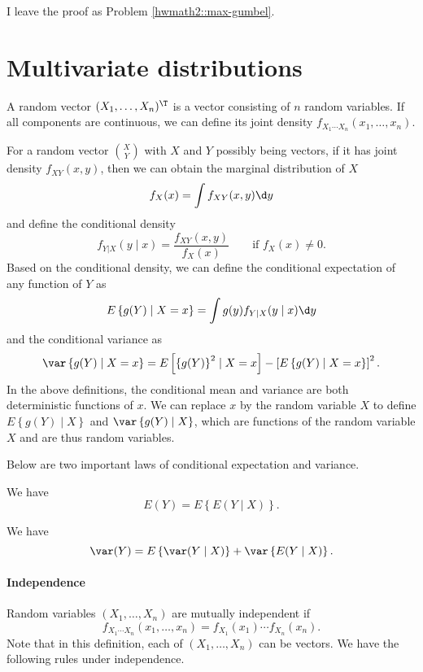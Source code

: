 I leave the proof as Problem \ref{hwmath2::max-gumbel}. 




\section{Multivariate distributions}

A random vector $(X_{1},\ldots,X_{n})^{\T}$ is a vector consisting of $n$ random
variables. If all components are continuous, we can define its joint
density $f_{X_{1}\cdots X_{n}}(x_{1},\ldots,x_{n}).$ 

For a random vector $\binom{X}{Y}$ with $X$ and $Y$ possibly being
vectors, if it has joint density $f_{XY}(x,y)$, then we can obtain
the marginal distribution of $X$   
$$
f_{X}(x)=\int f_{XY}(x,y)\d y
$$
and define the conditional density  
\[
f_{Y|X}(y\mid x)=\frac{f_{XY}(x,y)}{f_{X}(x)}\qquad \text{if }  f_{X}(x)\neq 0. 
\]
Based on the conditional density, we can define the conditional expectation
of any function of $Y$  as 
\[
E\left\{ g(Y)\mid X=x\right\} =\int g(y)f_{Y|X}(y\mid x)\d y
\]
and the conditional variance as 
\[
\var\left\{ g(Y)\mid X=x\right\} =E\left[\left\{ g(Y)\right\} ^{2}\mid X=x\right]-\left[E\left\{ g(Y)\mid X=x\right\} \right]^{2}.
\]
 In the above definitions, the conditional mean and variance are both deterministic
functions of $x$. We can replace $x$ by the random variable $X$ to define 
$E\left\{ g(Y)\mid X\right\} $
and $\var\left\{ g(Y)\mid X\right\} $, which are functions of the
random variable $X$ and are thus random variables. 

Below are two important laws of conditional expectation and variance. 

\begin{theorem}
 We have 
\[
E( Y ) =E\left\{  E ( Y \mid X ) \right\}  . 
\]
\end{theorem}


\begin{theorem}
\label{theorem::law-total-var}
We have 
\[
\var (Y) =E\left\{  \var( Y \mid X) \right\}  +\var\left\{  E(Y \mid X) \right\}  . 
\]
\end{theorem}
 

\paragraph*{Independence}

Random variables $(X_{1},\ldots,X_{n})$ are mutually independent
if 
$$
f_{X_{1}\cdots X_{n}}(x_{1},\ldots,x_{n})=f_{X_{1}}(x_{1})\cdots f_{X_{n}}(x_{n}).
$$
Note that in this definition, each of $(X_{1},\ldots,X_{n})$ can
be vectors. We have the following rules under independence.


